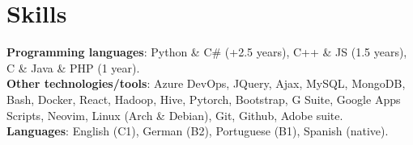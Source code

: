 \documentclass[letterpaper,11pt]{article}
\begin{document}
%
\section{Skills}
 \begin{itemize}[leftmargin=0.15in, label={}]
    \small{\item{
     \textbf{Programming languages}{: Python \& C\# (+2.5 years), C++ \& JS (1.5 years), C \& Java
     \& PHP (1 year).} \\
     \textbf{Other technologies/tools}{: Azure DevOps, JQuery, Ajax, MySQL, MongoDB, Bash, Docker,
     React, Hadoop, Hive, Pytorch, Bootstrap, G Suite, Google Apps Scripts, Neovim, Linux (Arch \&
     Debian), Git, Github, Adobe suite.} \\
     \textbf{Languages}{: English (C1), German (B2), Portuguese (B1), Spanish (native).}
    }}
 \end{itemize}


\end{document}
